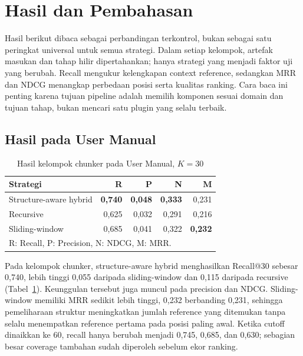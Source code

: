 \section{Hasil dan Pembahasan}

Hasil berikut dibaca sebagai perbandingan terkontrol, bukan sebagai satu peringkat universal untuk semua strategi. Dalam setiap kelompok, artefak masukan dan tahap hilir dipertahankan; hanya strategi yang menjadi faktor uji yang berubah. Recall mengukur kelengkapan context reference, sedangkan MRR dan NDCG menangkap perbedaan posisi serta kualitas ranking. Cara baca ini penting karena tujuan pipeline adalah memilih komponen sesuai domain dan tujuan tahap, bukan mencari satu plugin yang selalu terbaik.

\subsection{Hasil pada User Manual}

\begin{table}[t]
\centering
\caption{Hasil kelompok chunker pada User Manual, $K=30$}
\label{tab:hasil-manual-chunker}
\scriptsize
\begin{tabularx}{\columnwidth}{@{}p{}rrrr@{}}
\toprule
\textbf{Strategi} & \textbf{R} & \textbf{P} & \textbf{N} & \textbf{M}\\
\midrule
Structure-aware hybrid & \textbf{0,740} & \textbf{0,048} & \textbf{0,333} & 0,231\\
Recursive & 0,625 & 0,032 & 0,291 & 0,216\\
Sliding-window & 0,685 & 0,041 & 0,322 & \textbf{0,232}\\
\bottomrule
\multicolumn{5}{l}{\scriptsize R: Recall, P: Precision, N: NDCG, M: MRR.}
\end{tabularx}
\end{table}

Pada kelompok chunker, structure-aware hybrid menghasilkan Recall@30 sebesar 0,740, lebih tinggi 0,055 daripada sliding-window dan 0,115 daripada recursive (Tabel~\ref{tab:hasil-manual-chunker}). Keunggulan tersebut juga muncul pada precision dan NDCG. Sliding-window memiliki MRR sedikit lebih tinggi, 0,232 berbanding 0,231, sehingga pemeliharaan struktur meningkatkan jumlah reference yang ditemukan tanpa selalu menempatkan reference pertama pada posisi paling awal. Ketika cutoff dinaikkan ke 60, recall hanya berubah menjadi 0,745, 0,685, dan 0,630; sebagian besar coverage tambahan sudah diperoleh sebelum ekor ranking.

